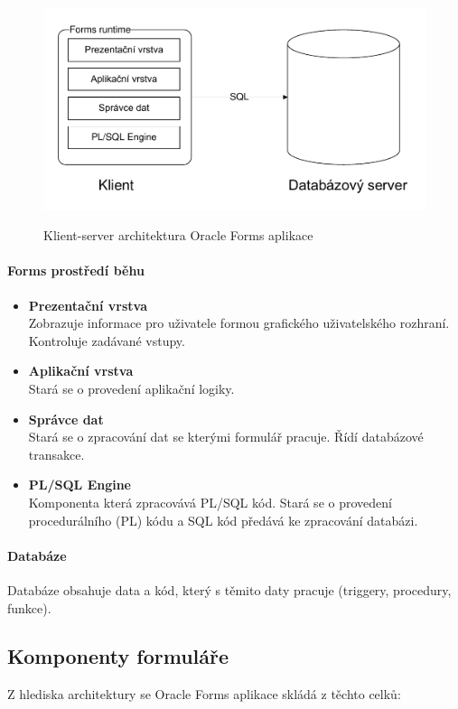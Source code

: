 \documentclass{diplomka}
\begin{document}
\begin{figure}[H]
  \centering
  \includegraphics[scale=0.7]{visio/arch.pdf}
\label{obr:arch}
\caption{Klient-server architektura Oracle Forms aplikace}
\end{figure}
\paragraph{Forms prostředí běhu}
\begin{itemize}[noitemsep,nolistsep]
\item \textbf{Prezentační vrstva}\\
Zobrazuje informace pro uživatele formou grafického uživatelského rozhraní. Kontroluje zadávané vstupy.
\item \textbf{Aplikační vrstva}\\
Stará se o provedení aplikační logiky.
\item \textbf{Správce dat}\\
Stará se o zpracování dat se kterými formulář pracuje. Řídí databázové transakce.
\item \textbf{PL/SQL Engine}\\
Komponenta která zpracovává PL/SQL kód. Stará se o provedení procedurálního (PL) kódu a SQL kód předává ke zpracování databázi.
\end{itemize}

\paragraph{Databáze}
Databáze obsahuje data a kód, který s těmito daty pracuje (triggery, procedury, funkce). 

\newpage
\subsection{Komponenty formuláře}
Z hlediska architektury se Oracle Forms aplikace skládá z těchto celků:
\end{document}
